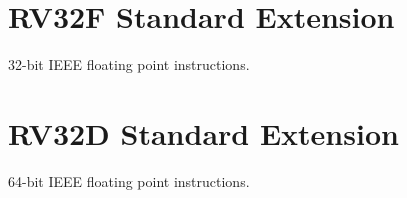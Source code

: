 \section{RV32F Standard Extension}

32-bit IEEE floating point instructions.

\section{RV32D Standard Extension}

64-bit IEEE floating point instructions.
